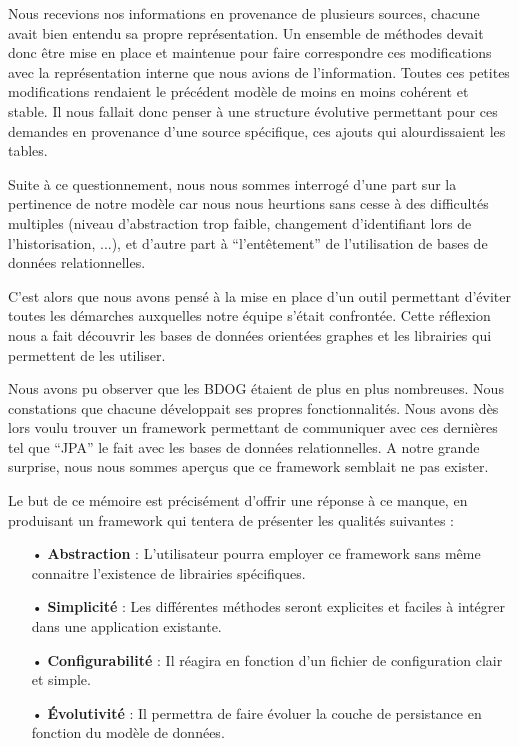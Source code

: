 \documentclass[a4paper,fleqn,12pt,oneside]{report}
\begin{document}
Nous recevions nos informations en provenance de plusieurs sources, chacune avait bien entendu sa propre représentation. Un ensemble de méthodes devait donc être mise en place et maintenue pour faire correspondre ces modifications avec la représentation interne que nous avions de l'information. Toutes ces petites modifications rendaient le précédent modèle de moins en moins cohérent et stable. Il nous fallait donc penser à une structure évolutive permettant pour ces demandes en provenance d’une source spécifique, ces ajouts qui alourdissaient les tables. 

Suite à ce questionnement, nous nous sommes interrogé d'une part sur la pertinence de notre modèle car nous nous heurtions sans cesse à des difficultés multiples (niveau d'abstraction trop faible, changement d'identifiant lors de l'historisation, ...), et d'autre part à \enquote{l'entêtement} de l'utilisation de bases de données relationnelles. 

C'est alors que nous avons pensé à la mise en place d'un outil permettant d'éviter toutes les démarches auxquelles notre équipe s'était confrontée. Cette réflexion nous a fait découvrir les bases de données orientées graphes et les librairies qui permettent de les utiliser.

Nous avons pu observer que les BDOG étaient de plus en plus nombreuses. Nous constations que chacune développait ses propres fonctionnalités. Nous avons dès lors voulu trouver un framework permettant de communiquer avec ces dernières tel que \enquote{JPA} le fait avec les bases de données relationnelles. A notre grande surprise, nous nous sommes aperçus que ce framework semblait ne pas exister.

Le but de ce mémoire est précisément d'offrir une réponse à ce manque, en produisant un framework qui tentera de présenter les qualités suivantes :
\begin{itemize}
\item[•] \textbf{Abstraction} : L'utilisateur pourra employer ce framework sans même connaitre l'existence de librairies spécifiques.
\item[•] \textbf{Simplicité} : Les différentes méthodes seront explicites et faciles à intégrer dans une application existante.
\item[•] \textbf{Configurabilité} : Il réagira en fonction d'un fichier de configuration clair et simple.
\item[•] \textbf{\'Evolutivité} : Il permettra de faire évoluer la couche de persistance en fonction du modèle de données.
\end{itemize}
\end{document}
